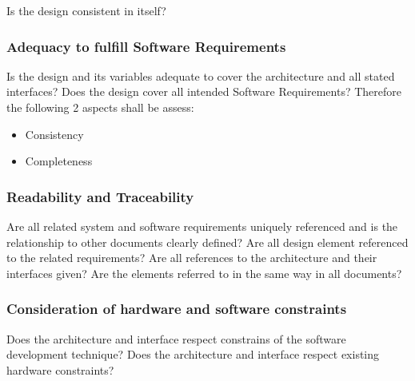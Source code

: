 \documentclass{article}
\begin{document}
Is the design consistent in itself?

\subsubsection{Adequacy to fulfill Software Requirements}

Is the design and its variables adequate to cover the architecture and all stated interfaces? Does the design cover all intended Software Requirements?
Therefore the following 2 aspects shall be assess:

\begin{itemize}
\item Consistency
\item Completeness
\end{itemize}

\subsubsection{Readability and Traceability}

Are all related system and software requirements uniquely referenced and is the relationship to other documents clearly defined? 
Are all design element referenced to the related requirements? Are all references to the architecture and their interfaces given?
Are the elements referred to in the same way in all documents?

\subsubsection{Consideration of hardware and software constraints}

Does the architecture and interface respect constrains of the software development technique?
Does the architecture and interface respect existing hardware constraints?
\end{document}

